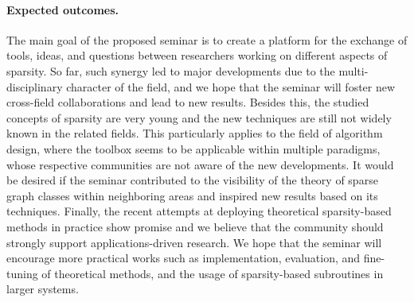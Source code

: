 \paragraph*{Expected outcomes.}
The main goal of the proposed seminar is to create a platform for the exchange of tools, ideas, and questions between researchers working on different aspects of sparsity.
So far, such synergy led to major developments due to the multi-disciplinary character of the field, and we hope that the seminar will foster new cross-field collaborations and lead to new results.
Besides this, the studied concepts of sparsity are very young and the new techniques are still not widely known in the related fields. 
This particularly applies to the field of algorithm design, where the toolbox seems to be applicable within multiple paradigms, whose respective communities are not aware of the new developments.
It would be desired if the seminar contributed to the visibility of the theory of sparse graph classes within neighboring areas and inspired new results based on its techniques.
Finally, the recent attempts at deploying theoretical sparsity-based methods in practice show promise and we believe that the community should strongly support applications-driven research.
We hope that the seminar will encourage more practical works such as implementation, evaluation, and fine-tuning of theoretical methods, and the usage of sparsity-based subroutines in larger systems.
